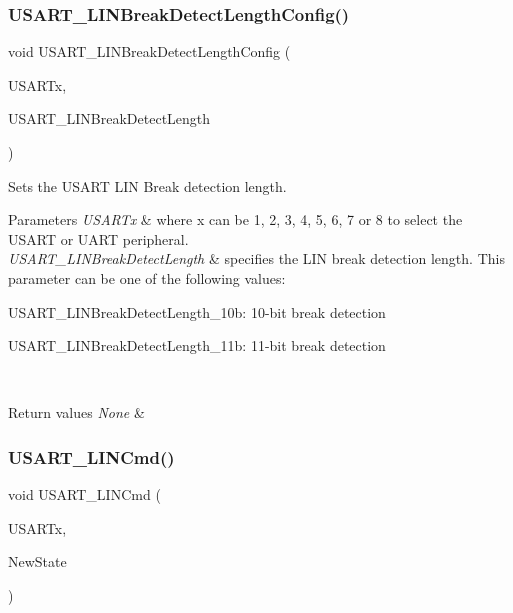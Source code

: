 \subsubsection{\texorpdfstring{U\+S\+A\+R\+T\+\_\+\+L\+I\+N\+Break\+Detect\+Length\+Config()}{USART\_LINBreakDetectLengthConfig()}}
{\footnotesize\ttfamily void U\+S\+A\+R\+T\+\_\+\+L\+I\+N\+Break\+Detect\+Length\+Config (\begin{DoxyParamCaption}\item[{U\+S\+A\+R\+T\+\_\+\+Type\+Def $\ast$}]{U\+S\+A\+R\+Tx,  }\item[{uint16\+\_\+t}]{U\+S\+A\+R\+T\+\_\+\+L\+I\+N\+Break\+Detect\+Length }\end{DoxyParamCaption})}



Sets the U\+S\+A\+RT L\+IN Break detection length. 


\begin{DoxyParams}{Parameters}
{\em U\+S\+A\+R\+Tx} & where x can be 1, 2, 3, 4, 5, 6, 7 or 8 to select the U\+S\+A\+RT or U\+A\+RT peripheral. \\
\hline
{\em U\+S\+A\+R\+T\+\_\+\+L\+I\+N\+Break\+Detect\+Length} & specifies the L\+IN break detection length. This parameter can be one of the following values\+: \begin{DoxyItemize}
\item U\+S\+A\+R\+T\+\_\+\+L\+I\+N\+Break\+Detect\+Length\+\_\+10b\+: 10-\/bit break detection \item U\+S\+A\+R\+T\+\_\+\+L\+I\+N\+Break\+Detect\+Length\+\_\+11b\+: 11-\/bit break detection \end{DoxyItemize}
\\
\hline
\end{DoxyParams}

\begin{DoxyRetVals}{Return values}
{\em None} & \\
\hline
\end{DoxyRetVals}
\mbox{\label{group___u_s_a_r_t___group4_ga9fdd6296f4ca4acdfcbd58bf56bd4185}} 
\subsubsection{\texorpdfstring{U\+S\+A\+R\+T\+\_\+\+L\+I\+N\+Cmd()}{USART\_LINCmd()}}
{\footnotesize\ttfamily void U\+S\+A\+R\+T\+\_\+\+L\+I\+N\+Cmd (\begin{DoxyParamCaption}\item[{U\+S\+A\+R\+T\+\_\+\+Type\+Def $\ast$}]{U\+S\+A\+R\+Tx,  }\item[{Functional\+State}]{New\+State }\end{DoxyParamCaption})}



